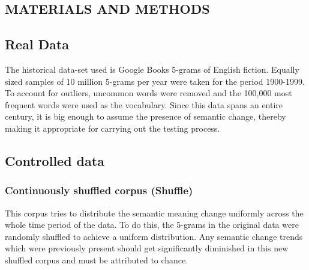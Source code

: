 \documentclass[a0,landscape]{a0poster}
\begin{document}
\begin{multicols}{4}

\color{DarkSlateGray} %




\section*{MATERIALS AND METHODS}


\subsection*{Real Data}
The historical data-set used is Google Books 5-grams of English fiction. Equally sized samples of 10 million 5-grams per year were taken for the period 1900-1999. To account for outliers, uncommon words were removed and the 100,000 most frequent words were used as the vocabulary. Since this data spans an entire century, it is big enough to assume the presence of semantic change, thereby making it appropriate for carrying out the testing process.

\subsection*{Controlled data}
\subsubsection*{Continuously shuffled corpus (Shuffle)}
This corpus tries to distribute the semantic meaning change uniformly across the whole time period of the data. To do this, the 5-grams in the original data were randomly shuffled to achieve a uniform distribution. Any semantic change trends which were previously present should get significantly diminished in this new shuffled corpus and must be attributed to chance.


\end{multicols}
\end{document}
